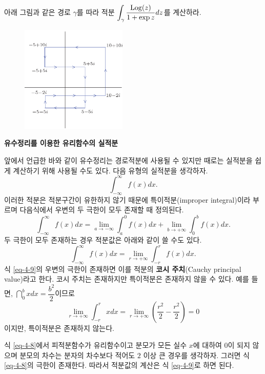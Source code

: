 \begin{salt_exercise}\label{ex-4-40}
아래 그림과 같은 경로 $\gamma$를 따라
적분 $\displaystyle\int_\gamma \displaystyle\frac{\mathop{\mathrm{Log}}(z)}{1+\exp z} dz$를 계산하라.
\begin{figure}[h!]
\begin{center}
\includegraphics[width=0.45\textwidth]{./SaltChapter/figs/fig-4-0-11}
\end{center}
\end{figure}
\end{salt_exercise}

{\bf 유수정리를 이용한 유리함수의 실적분}

앞에서 언급한 바와 같이
유수정리는 경로적분에 사용될 수 있지만
때로는 실적분을 쉽게 계산하기 위해 사용될 수도 있다.
다음 유형의 실적분을 생각하자.
\[
\int_{-\infty}^\infty f(x)dx.
\]
이러한 적분은
적분구간이 유한하지 않기 때문에 특이적분(improper integral)이라 부르며
다음식에서 우변의 두 극한이 모두 존재할 때 정의된다.
\begin{equation}\label{eq-4-8}
\int_{-\infty}^\infty f(x)dx = \lim_{a\to-\infty} \int_a^0 f(x) dx
+ \lim_{b\to+\infty} \int_0^b f(x)dx.
\end{equation}
두 극한이 모두 존재하는 경우 적분값은 아래와 같이 쓸 수도 있다.
\begin{equation} \label{eq-4-9}
\int_{-\infty}^\infty f(x)dx = \lim_{r\to+\infty} \int_{-r}^r f(x) dx.
\end{equation}
식 \eqref{eq-4-9}의 우변의 극한이 존재하면 
이를 적분의 {\bf 코시 주치}(Cauchy principal value)라고 한다.
코시 주치는 존재하지만 특이적분은 존재하지 않을 수 있다.
예를 들면, $\dint_0^b xdx = \dfrac{b^2}2$이므로
\[
\lim_{r\to+\infty} \int_{-r}^r x dx = 
\lim_{r\to+\infty} \left( \dfrac{r^2}2 - \dfrac{r^2}2 \right) = 0
\]
이지만, 특이적분은 존재하지 않는다.

식 \eqref{eq-4-8}에서 피적분함수가 유리함수이고
분모가 모든 실수 $x$에 대하여 $0$이 되지 않으며
분모의 차수는 분자의 차수보다 적어도 $2$ 이상 큰 경우를 생각하자.
그러면 식 \eqref{eq-4-8}의 극한이 존재한다. 따라서
적분값의 계산은 식 \eqref{eq-4-9}로 하면 된다.

